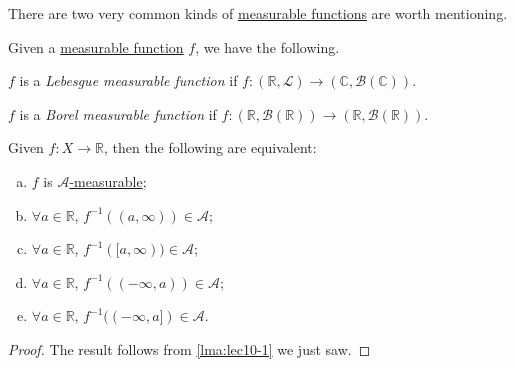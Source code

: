 There are two very common kinds of \hyperref[def:measurable-function]{measurable functions} are worth mentioning.
\begin{definition*}
	Given a \hyperref[def:measurable-function]{measurable function} \(f\), we have the following.
	\begin{definition}\label{def:Lebesgue-measurable-function}
		\(f\) is a \emph{Lebesgue measurable function} if \(f\colon (\mathbb{R} , \mathcal{L} ) \to (\mathbb{C} , \mathcal{B} (\mathbb{C}))\).
	\end{definition}

	\begin{definition}\label{def:Borel-measurable-function}
		\(f\) is a \emph{Borel measurable function} if \(f\colon (\mathbb{R} , \mathcal{B} (\mathbb{R} ))\to (\mathbb{R} , \mathcal{B} (\mathbb{R} ))\).
	\end{definition}
\end{definition*}


\begin{lemma}\label{lma:lec10-2}
	Given \(f\colon X\to \mathbb{R} \), then the following are equivalent:
	\begin{enumerate}[(a)]
		\item \(f\) is \hyperref[def:A-measurable-function]{\(\mathcal{A}\)-measurable};
		\item \(\forall a\in\mathbb{R} \), \(f^{-1} ((a, \infty ))\in\mathcal{A} \);
		\item \(\forall a\in\mathbb{R} \), \(f^{-1} ([a, \infty ))\in\mathcal{A} \);
		\item \(\forall a\in\mathbb{R} \), \(f^{-1} ((-\infty, a))\in\mathcal{A} \);
		\item \(\forall a\in\mathbb{R} \), \(f^{-1} ((-\infty, a])\in\mathcal{A} \).
	\end{enumerate}
\end{lemma}
\begin{proof}
	The result follows from \autoref{lma:lec10-1} we just saw.
\end{proof}

